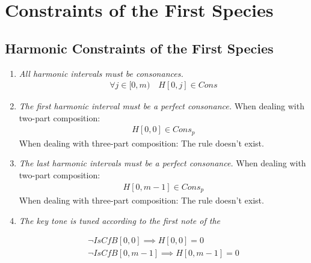 \section*{Constraints of the First Species}
\subsection*{Harmonic Constraints of the First Species}
\begin{enumerate}[wide, label=\bfseries 1.H\arabic*]
  \item\label{rule:allcons}{\textit{All harmonic intervals must be consonances.}} 
\begin{equation}
    \begin{gathered}
        \forall j \in [0, m)\quad 
        H[0, j] \in Cons
    \end{gathered}
\end{equation}

\item\label{rule:firstpcons}{\textit{The first harmonic interval must be a perfect consonance.}}
When dealing with two-part composition:
\begin{equation}
    \begin{gathered}
        H[0, 0] \in Cons_{p}
    \end{gathered}
\end{equation}
When dealing with three-part composition:
The rule doesn't exist.

\item\label{rule:lastpcons}{\textit{The last harmonic intervals must be a perfect consonance.}}
When dealing with two-part composition:
\begin{equation}
  \begin{gathered}
      H[0, m-1] \in Cons_{p}
  \end{gathered}
\end{equation}
When dealing with three-part composition:
The rule doesn't exist.

\item\label{rule:keytone}{\textit{The key tone is tuned according to the first note of the \cfdot}}

\begin{equation}
    \begin{gathered}
        \lnot \mathit{IsCfB}[0, 0] \implies H[0, 0] = 0\\
        \lnot \mathit{IsCfB}[0, m-1] \implies H[0, m-1] = 0
    \end{gathered}
\end{equation}


\end{enumerate}
